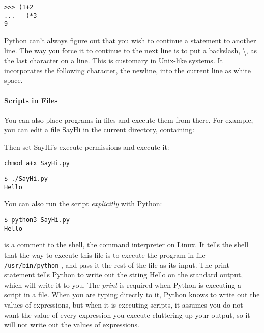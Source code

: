 \begin{verbatim}
>>> (1+2
...   )*3
9
\end{verbatim}

Python can't always figure out
that you wish to continue a statement to another line. The way you force
it to continue to the next line is to put a backslash, \textbackslash{},
as the last character on a line. This is customary in Unix-like systems.
It incorporates the following character, the newline, into the current
line as white space.

\paragraph{Scripts in Files}

You can also place programs in
files and execute them from there. For example, you can edit a file
SayHi in the current directory, containing:

\resetlinenumber[1]
\linenumbers
\begin{tt}
  
\end{tt}
\nolinenumbers

Then set SayHi's execute permissions and execute it:

\begin{verbatim}
chmod a+x SayHi.py
\end{verbatim}

\begin{verbatim}
$ ./SayHi.py
Hello
\end{verbatim}

You can also run the script \emph{explicitly} with Python:

\begin{verbatim}
$ python3 SayHi.py
Hello
\end{verbatim}

 is a
comment to the shell, the command interpreter on Linux. It tells the
shell that the way to execute this file is to execute the program in
file \texttt{/usr/bin/python} , and pass it the rest of the file as its
input. The print statement tells Python to write out the string Hello on
the standard output, which will write it to you. The \emph{print} is
required when Python is executing a script in a file. When you are
typing directly to it, Python knows to write out the values of
expressions, but when it is executing scripts, it assumes you do not
want the value of every expression you execute cluttering up your
output, so it will not write out the values of expressions.


